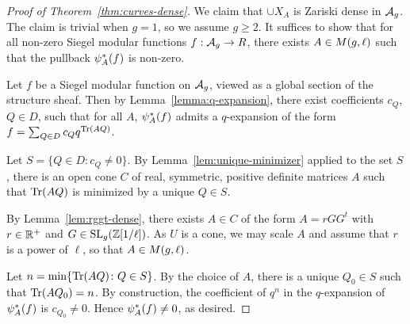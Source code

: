 \documentclass{amsart}
\begin{document}
\begin{proof}[Proof of Theorem~\ref{thm:curves-dense}]
  We claim that $\cup X_A$ is Zariski dense in $\mathcal{A}_g$. The claim is trivial when $g = 1$, so we assume $g \geq 2$. It suffices to show that for all non-zero Siegel modular functions $f: \mathcal{A}_g \to R$, there exists $A \in M(g,\ell)$ such that the pullback $\psi_{A}^*(f)$ is non-zero.

  Let $f$ be a Siegel modular function on $\mathcal{A}_g$, viewed as a global section of the structure sheaf. Then by Lemma~\ref{lemma:q-expansion}, there exist coefficients $c_Q$, $Q \in D$, such that for all $A$, $\psi_{A}^*(f)$ admits a $q$-expansion of the form $f = \sum_{Q \in D} c_Q q^{\operatorname{Tr}(AQ)}$.

  Let $S = \{ Q \in D :c_Q \neq 0\}$. By Lemma~\ref{lem:unique-minimizer} applied to the set $S$, there is an open cone $C$ of real, symmetric, positive definite matrices $A$ such that $\operatorname{Tr}(AQ)$ is minimized by a unique $Q \in S$.

  By Lemma~\ref{lem:rggt-dense}, there exists $A \in C$ of the form $A = rGG^t$ with $r \in \mathbb{R}^+$ and $G \in \operatorname{SL}_g(\mathbb{Z}[1/\ell])$. As $U$ is a cone, we may scale $A$ and assume that $r$ is a power of $\ell$, so that $A \in M(g,\ell)$.

  Let $n = \min \{\operatorname{Tr}(AQ) \colon Q \in S\}$. By the choice of $A$, there is a unique $Q_0 \in S$ such that $\operatorname{Tr}(AQ_0) = n$. %
  By construction, the coefficient of $q^n$ in the $q$-expansion of $\psi_{A}^*(f)$ is $c_{Q_0} \neq 0$. Hence $\psi_{A}^*(f) \neq 0$, as desired.
\end{proof}









\end{document}
